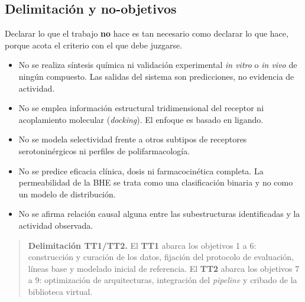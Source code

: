 \subsection{Delimitación y no-objetivos}
\label{sec:obj-delimitacion}

Declarar lo que el trabajo \textbf{no} hace es tan necesario como declarar lo que
hace, porque acota el criterio con el que debe juzgarse.

\begin{itemize}
  \item No se realiza síntesis química ni validación experimental
        \textit{in vitro} o \textit{in vivo} de ningún compuesto. Las salidas
        del sistema son predicciones, no evidencia de actividad.
  \item No se emplea información estructural tridimensional del receptor ni
        acoplamiento molecular (\textit{docking}). El enfoque es basado en
        ligando.
  \item No se modela selectividad frente a otros subtipos de receptores
        serotoninérgicos ni perfiles de polifarmacología.
  \item No se predice eficacia clínica, dosis ni farmacocinética completa. La
        permeabilidad de la BHE se trata como una clasificación binaria y no
        como un modelo de distribución.
  \item No se afirma relación causal alguna entre las subestructuras
        identificadas y la actividad observada.
\end{itemize}

\begin{quote}\small
\textbf{Delimitación TT1/TT2.} El \textbf{TT1} abarca los objetivos 1 a 6:
construcción y curación de los datos, fijación del protocolo de evaluación,
líneas base y modelado inicial de referencia. El \textbf{TT2} abarca los
objetivos 7 a 9: optimización de arquitecturas, integración del
\textit{pipeline} y cribado de la biblioteca virtual.
\end{quote}